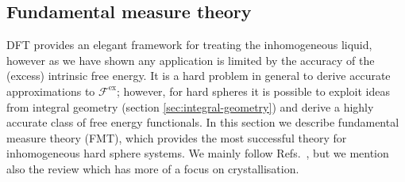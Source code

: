 
\subsection{Fundamental measure theory}
\label{sec:fmt}

DFT provides an elegant framework for treating the inhomogeneous liquid, however as we have shown any application is limited by the accuracy of the (excess) intrinsic free energy.
It is a hard problem in general to derive accurate approximations to $\mathcal{F}^\mathrm{ex}$; however, for hard spheres it is possible to exploit ideas from integral geometry (section \ref{sec:integral-geometry}) and derive a highly accurate class of free energy functionals.
In this section we describe fundamental measure theory (FMT), which provides the most successful theory for inhomogeneous hard sphere systems.
We mainly follow Refs.\ \cite{RothJPCM2010,SantosPRE2012}, but we mention also the review \cite{LutskoAiCP2010} which has more of a focus on crystallisation.


